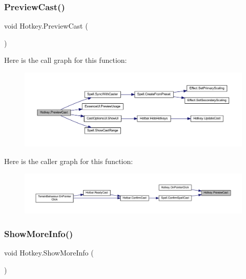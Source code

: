 \subsubsection{\texorpdfstring{PreviewCast()}{PreviewCast()}}
{\footnotesize\ttfamily void Hotkey.\+Preview\+Cast (\begin{DoxyParamCaption}{ }\end{DoxyParamCaption})}

Here is the call graph for this function\+:\nopagebreak
\begin{figure}[H]
\begin{center}
\leavevmode
\includegraphics[width=350pt]{class_hotkey_a209f6726592cf69b7e21bd68ced48cb3_cgraph}
\end{center}
\end{figure}
Here is the caller graph for this function\+:\nopagebreak
\begin{figure}[H]
\begin{center}
\leavevmode
\includegraphics[width=350pt]{class_hotkey_a209f6726592cf69b7e21bd68ced48cb3_icgraph}
\end{center}
\end{figure}
\mbox{\label{class_hotkey_ae8ab38a3ddf49344ede61f8fb67892c5}} 
\subsubsection{\texorpdfstring{ShowMoreInfo()}{ShowMoreInfo()}}
{\footnotesize\ttfamily void Hotkey.\+Show\+More\+Info (\begin{DoxyParamCaption}{ }\end{DoxyParamCaption})}

\mbox{\label{class_hotkey_a15822d970e7f05f8ea8ef4069a4e245a}} 
